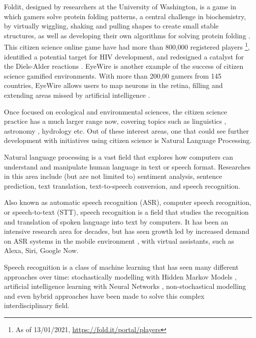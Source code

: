 Foldit, designed by researchers at the University of Washington, is a game in which gamers solve protein folding patterns, a central challenge in biochemistry, by virtually wiggling, shaking and pulling shapes to create small stable structures, as well as developing their own algorithms for solving protein folding \cite{bourzac2008enlisting}. This citizen science online game have had more than 800,000 registered players \footnote{As of 13/01/2021, \url{https://fold.it/portal/players}}, identified a potential target for HIV development, and redesigned a catalyst for the Diels-Alder reactions \cite{kreitmair2019citizen}. EyeWire is another example of the success of citizen science gamified environments. With more than 200,00 gamers from 145 countries, EyeWire allows users to map neurons in the retina, filling and extending areas missed by artificial intelligence \cite{kreitmair2019citizen}.

Once focused on ecological and environmental sciences, the citizen science practice has a much larger range now, covering topics such as linguistics \cite{svendsen2018dynamics}, astronomy \cite{marshall2015ideas}, hydrology \cite{buytaert2014citizen} etc. Out of these interest areas, one that could see further development with initiatives using citizen science is Natural Language Processing.

Natural language processing is a vast field that explores how computers can understand and manipulate human language in text or speech format. Researches in this area include (but are not limited to) sentiment analysis, sentence prediction, text translation, text-to-speech conversion, and speech recognition.

Also known as automatic speech recognition (ASR), computer speech recognition, or speech-to-text (STT), speech recognition is a field that studies the recognition and translation of spoken language into text by computers. It has been an intensive research area for decades, but has seen growth led by increased demand on ASR systems in the mobile environment \cite{yu2016automatic}, with virtual assistants, such as Alexa, Siri, Google Now.

Speech recognition is a class of machine learning that has seen many different approaches over time: stochastically modelling with Hidden Markov Models  \cite{gales2008application}, artificial intelligence learning with Neural Networks \cite{graves2013speech}, non-stochastical modelling \cite{burget2003nonrandomattr} and even hybrid approaches \cite{wang2020transformer} have been made to solve this complex interdisciplinary field.

